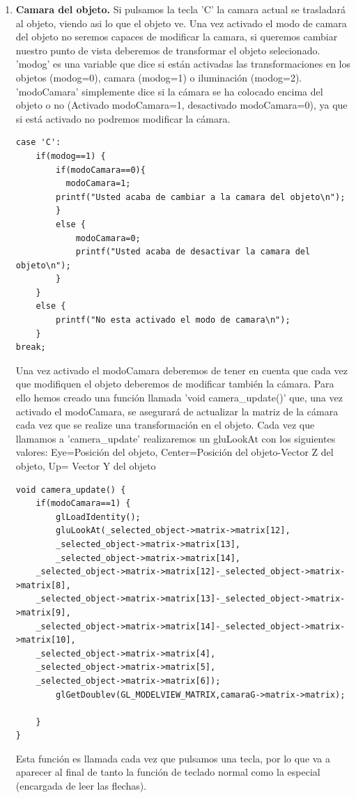 \documentclass[12pt,a4paper]{article}
\begin{document}
\begin{enumerate}
\begin{enumerate}
\item \textbf{Camara del objeto.}
Si pulsamos la tecla 'C' la camara actual se trasladará al objeto, viendo asi lo que el objeto ve. Una vez activado el modo de camara del objeto no seremos capaces de modificar la camara, si queremos cambiar nuestro punto de vista deberemos de transformar el objeto selecionado.\newline
'modog' es una variable que dice si están activadas las transformaciones en los objetos (modog=0), camara (modog=1) o iluminación (modog=2). 'modoCamara' simplemente dice si la cámara se ha colocado encima del objeto o no (Activado modoCamara=1, desactivado modoCamara=0), ya que si está activado no podremos modificar la cámara.\newline
\begin{lstlisting}
case 'C':
	if(modog==1) {
		if(modoCamara==0){
  		  modoCamara=1;
      	printf("Usted acaba de cambiar a la camara del objeto\n");
    	}
    	else {
    		modoCamara=0;
    		printf("Usted acaba de desactivar la camara del objeto\n");
    	}
	}
	else {
		printf("No esta activado el modo de camara\n");
	}
break;
\end{lstlisting}
Una vez activado el modoCamara deberemos de tener en cuenta que cada vez que modifiquen el objeto deberemos de modificar también la cámara. Para ello hemos creado una función llamada 'void camera\_update()' que, una vez activado el modoCamara, se asegurará de actualizar la matriz de la cámara cada vez que se realize una transformación en el objeto. Cada vez que llamamos a 'camera\_update' realizaremos un gluLookAt con los siguientes valores: Eye=Posición del objeto, Center=Posición del objeto-Vector Z del objeto, Up= Vector Y del objeto\newline
\begin{lstlisting}
void camera_update() {
	if(modoCamara==1) {
		glLoadIdentity();
		gluLookAt(_selected_object->matrix->matrix[12],
		_selected_object->matrix->matrix[13],
		_selected_object->matrix->matrix[14],
    _selected_object->matrix->matrix[12]-_selected_object->matrix->matrix[8],
    _selected_object->matrix->matrix[13]-_selected_object->matrix->matrix[9],
    _selected_object->matrix->matrix[14]-_selected_object->matrix->matrix[10],
    _selected_object->matrix->matrix[4],
    _selected_object->matrix->matrix[5],
    _selected_object->matrix->matrix[6]);
		glGetDoublev(GL_MODELVIEW_MATRIX,camaraG->matrix->matrix);

	}
}
\end{lstlisting}
Esta función es llamada cada vez que pulsamos una tecla, por lo que va a aparecer al final de tanto la función de teclado normal como la especial (encargada de leer las flechas).
\end{enumerate}%





\end{enumerate}
\end{document}
